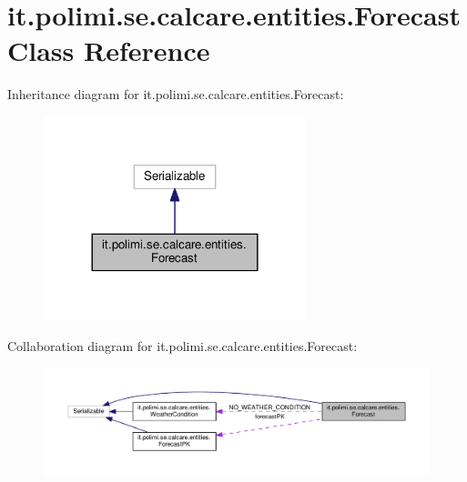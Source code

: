 \hypertarget{classit_1_1polimi_1_1se_1_1calcare_1_1entities_1_1Forecast}{}\section{it.\+polimi.\+se.\+calcare.\+entities.\+Forecast Class Reference}
\label{classit_1_1polimi_1_1se_1_1calcare_1_1entities_1_1Forecast}


Inheritance diagram for it.\+polimi.\+se.\+calcare.\+entities.\+Forecast\+:
\nopagebreak
\begin{figure}[H]
\begin{center}
\leavevmode
\includegraphics[width=216pt]{classit_1_1polimi_1_1se_1_1calcare_1_1entities_1_1Forecast__inherit__graph}
\end{center}
\end{figure}


Collaboration diagram for it.\+polimi.\+se.\+calcare.\+entities.\+Forecast\+:
\nopagebreak
\begin{figure}[H]
\begin{center}
\leavevmode
\includegraphics[width=350pt]{classit_1_1polimi_1_1se_1_1calcare_1_1entities_1_1Forecast__coll__graph}
\end{center}
\end{figure}
